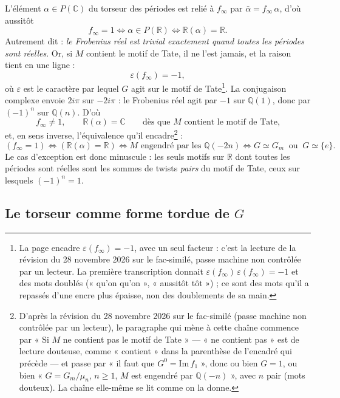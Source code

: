 \documentclass[11pt,a4paper]{article}
\begin{document}
L'élément $\alpha \in P(\mathbb{C})$ du torseur des périodes est relié à
$f_{\infty}$ par $\bar{\alpha} = f_{\infty}\,\alpha$, d'où aussitôt
\[
  f_{\infty} = 1 \iff \alpha \in P(\mathbb{R}) \iff \mathbb{R}(\alpha) = \mathbb{R} .
\]
Autrement dit : \emph{le Frobenius réel est trivial exactement quand toutes les
périodes sont réelles}. Or, si $M$ contient le motif de Tate, il ne l'est
jamais, et la raison tient en une ligne :
\[
  \varepsilon(f_{\infty}) = -1 ,
\]
où $\varepsilon$ est le caractère par lequel $G$ agit sur le motif de
Tate\footnote{La page encadre $\varepsilon(f_{\infty}) = -1$, avec un seul
facteur : c'est la lecture de la révision du 28 novembre 2026 sur le
fac-similé, passe machine non contrôlée par un lecteur. La première
transcription donnait $\varepsilon(f_{\infty})\,\varepsilon(f_{\infty}) = -1$
et des mots doublés (« qu'on qu'on », « aussitôt tôt ») ; ce sont des mots
qu'il a repassés d'une encre plus épaisse, non des doublements de sa main.}. La conjugaison complexe envoie $2i\pi$ sur $-2i\pi$ : le
Frobenius réel agit par $-1$ sur $\mathbb{Q}(1)$, donc par $(-1)^{n}$ sur
$\mathbb{Q}(n)$. D'où
\[
  f_{\infty} \neq 1 , \qquad \mathbb{R}(\alpha) = \mathbb{C}
  \qquad \text{dès que } M \text{ contient le motif de Tate,}
\]
et, en sens inverse, l'équivalence qu'il encadre\footnote{D'après la
révision du 28 novembre 2026 sur le fac-similé (passe machine non contrôlée
par un lecteur), le paragraphe qui mène à cette chaîne commence par « Si $M$
ne contient pas le motif de Tate » — « ne contient pas » est de lecture
douteuse, comme « contient » dans la parenthèse de l'encadré qui précède — et
passe par « il faut que $G^{0} = \mathrm{Im}\, f_{1}$ », donc ou bien $G = 1$,
ou bien « $G = G_{m}/\mu_{n}$, $n \geqslant 1$, $M$ est engendré par
$\mathbb{Q}(-n)$ », avec $n$ pair (mots douteux). La chaîne elle-même se lit
comme on la donne.} :
\[
  (f_{\infty} = 1) \iff (\mathbb{R}(\alpha) = \mathbb{R}) \iff
  M \text{ engendré par les } \mathbb{Q}(-2n) \iff
  G \simeq G_{m} \ \text{ ou } \ G \simeq \{e\} .
\]
Le cas d'exception est donc minuscule : les seuls motifs sur $\mathbb{R}$ dont
toutes les périodes sont réelles sont les sommes de twists \emph{pairs} du motif
de Tate, ceux sur lesquels $(-1)^{n} = 1$.

\subsection*{Le torseur comme forme tordue de $G$}
\end{document}
